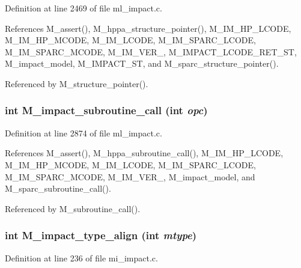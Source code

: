 Definition at line 2469 of file ml\_\-impact.c.

References M\_\-assert(), M\_\-hppa\_\-structure\_\-pointer(), M\_\-IM\_\-HP\_\-LCODE, M\_\-IM\_\-HP\_\-MCODE, M\_\-IM\_\-LCODE, M\_\-IM\_\-SPARC\_\-LCODE, M\_\-IM\_\-SPARC\_\-MCODE, M\_\-IM\_\-VER\_, M\_\-IMPACT\_\-LCODE\_\-RET\_\-ST, M\_\-impact\_\-model, M\_\-IMPACT\_\-ST, and M\_\-sparc\_\-structure\_\-pointer().

Referenced by M\_\-structure\_\-pointer().
\subsubsection{\setlength{\rightskip}{0pt plus 5cm}int M\_\-impact\_\-subroutine\_\-call (int {\em opc})}\label{m__impact_8h_2fec04e2059724cadae6a4b3887cf5fc}




Definition at line 2874 of file ml\_\-impact.c.

References M\_\-assert(), M\_\-hppa\_\-subroutine\_\-call(), M\_\-IM\_\-HP\_\-LCODE, M\_\-IM\_\-HP\_\-MCODE, M\_\-IM\_\-LCODE, M\_\-IM\_\-SPARC\_\-LCODE, M\_\-IM\_\-SPARC\_\-MCODE, M\_\-IM\_\-VER\_, M\_\-impact\_\-model, and M\_\-sparc\_\-subroutine\_\-call().

Referenced by M\_\-subroutine\_\-call().
\subsubsection{\setlength{\rightskip}{0pt plus 5cm}int M\_\-impact\_\-type\_\-align (int {\em mtype})}\label{m__impact_8h_e84f3c6ef3e27221d95a0e75a58f7710}




Definition at line 236 of file mi\_\-impact.c.

